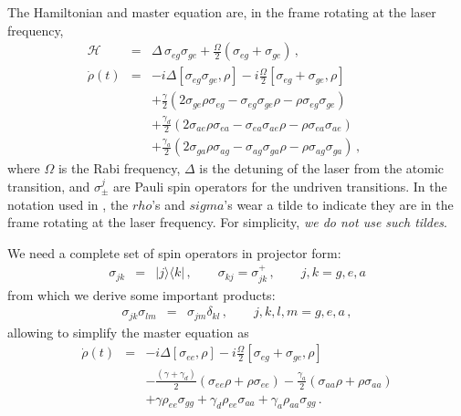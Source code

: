 \documentclass[twocolumn,aps,eqsecnum,showkeys,amsmath]{revtex4-2}
\begin{document}
The Hamiltonian and master equation are, in the frame rotating at the laser 
frequency, 
%
\begin{eqnarray}
\mathcal{H} &=& \Delta \, \sigma_{eg} \sigma_{ge} 
	+\frac{\Omega}{2} ( \sigma_{eg} +\sigma_{ge}) 	 \,, 		\\
%
\dot{\rho}(t) &=& -i \Delta [\sigma_{eg} \sigma_{ge} ,\rho] 
	-i \frac{\Omega}{2} [\sigma_{eg} +\sigma_{ge} ,\rho]    \nonumber \\ 
&& +\frac{\gamma}{2} (2\sigma_{ge} \rho \sigma_{eg} 
  -\sigma_{eg} \sigma_{ge} \rho  -\rho \sigma_{eg} \sigma_{ge})     
  \nonumber \\
&& + \frac{\gamma_d}{2} (2\sigma_{ae} \rho \sigma_{ea} 
  -\sigma_{ea} \sigma_{ae} \rho -\rho \sigma_{ea} \sigma_{ae}) 	\nonumber \\ 
&& +\frac{\gamma_a}{2} (2\sigma_{ga} \rho \sigma_{ag} 
  -\sigma_{ag} \sigma_{ga} \rho  -\rho \sigma_{ag} \sigma_{ga}) \,, \qquad
\end{eqnarray}
where $\Omega$ is the Rabi frequency, $\Delta$ is the detuning of the laser 
from the atomic transition, and $\sigma_{\pm}^j$ are Pauli spin operators for 
the undriven transitions. In the notation used in \cite{Carm99}, the $rho$'s 
and $sigma$'s wear a tilde to indicate they are in the frame rotating at the 
laser frequency. For simplicity, \textit{we do not use such tildes}. 

We need a complete set of spin operators in projector form: 
%
\begin{eqnarray*}
\sigma_{jk} &=& |j \rangle\langle k| \,, 
	\qquad \sigma_{kj} = \sigma_{jk}^+ \,, \qquad j,k=g,e,a   
\end{eqnarray*}
from which we derive some important products: 
%
\begin{eqnarray*}
\sigma_{jk} \sigma_{lm} &=& \sigma_{jm} \delta_{kl}  \,, 
\qquad  j,k,l,m =g,e,a 	\,, 
\end{eqnarray*}
allowing to simplify the master equation as 
%
\begin{eqnarray}
\dot{\rho}(t) &=& -i \Delta [\sigma_{ee} ,\rho] 
	-i \frac{\Omega}{2} [\sigma_{eg} +\sigma_{ge} ,\rho]    \nonumber \\ 
&& -	\frac{(\gamma +\gamma_d)}{2} (\sigma_{ee} \rho +\rho \sigma_{ee}) 
    -\frac{\gamma_a}{2} (\sigma_{aa} \rho +\rho \sigma_{aa}) 
        \nonumber \\
&& +\gamma \rho_{ee} \sigma_{gg}  +\gamma_d \rho_{ee} \sigma_{aa}    
    +\gamma_a \rho_{aa} \sigma_{gg}  \,.     \label{masterEqC}
\end{eqnarray}
\end{document}
